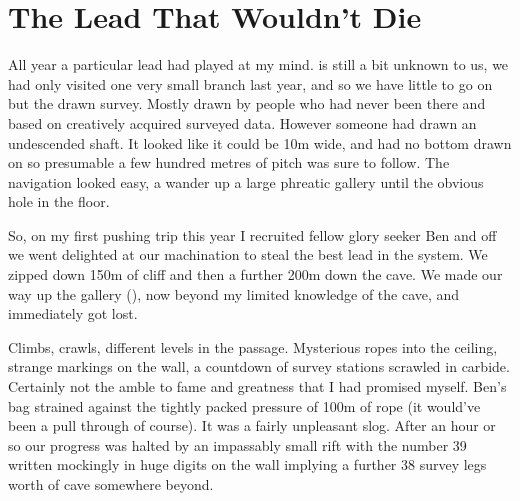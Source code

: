 \section{The Lead That Wouldn't Die}
\begin{marginfigure}
\end{marginfigure}

All year a particular lead had played at my mind.  is still a bit unknown to us, we had only visited one very small branch last year, and so we have little to go on but the drawn survey. Mostly drawn by people who had never been there and based on creatively acquired surveyed data. However someone had drawn an undescended shaft. It looked like it could be 10m wide, and had no bottom drawn on so presumable a few hundred metres of pitch was sure to follow. The navigation looked easy, a wander up a large phreatic gallery until the obvious hole in the floor.

So, on my first pushing trip this year I recruited fellow glory seeker Ben and off we went delighted at our machination to steal the best lead in the system. We zipped down 150m of cliff and then a further 200m down the cave. We made our way up the gallery (), now beyond my limited knowledge of the cave, and immediately got lost.
 
Climbs, crawls, different levels in the passage. Mysterious ropes into the ceiling, strange markings on the wall, a countdown of survey stations scrawled in carbide. Certainly not the amble to fame and greatness that I had promised myself.  Ben’s bag strained against the tightly packed pressure of 100m of rope (it would’ve been a pull through of course). It was a fairly unpleasant slog. After an hour or so our progress was halted by an impassably small rift with the number 39 written mockingly in huge digits on the wall implying a further 38 survey legs worth of cave somewhere beyond.
 
